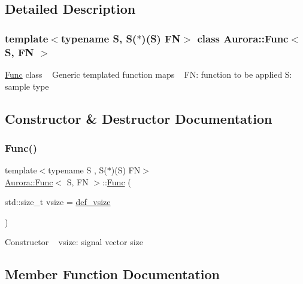 \subsection{Detailed Description}
\subsubsection*{template$<$typename S, S($\ast$)(\+S) FN$>$\newline
class Aurora\+::\+Func$<$ S, F\+N $>$}

\hyperlink{class_aurora_1_1_func}{Func} class ~\newline
Generic templated function maps ~\newline
FN\+: function to be applied S\+: sample type 

\subsection{Constructor \& Destructor Documentation}
\mbox{\label{class_aurora_1_1_func_a2a97c0f4eaf70c7e922876debeb14abe}} 
\subsubsection{\texorpdfstring{Func()}{Func()}}
{\footnotesize\ttfamily template$<$typename S , S($\ast$)(\+S) FN$>$ \\
\hyperlink{class_aurora_1_1_func}{Aurora\+::\+Func}$<$ S, FN $>$\+::\hyperlink{class_aurora_1_1_func}{Func} (\begin{DoxyParamCaption}\item[{std\+::size\+\_\+t}]{vsize = {\ttfamily \hyperlink{namespace_aurora_afaaddf667a06e7ce23c667a8b7295263}{def\+\_\+vsize}} }\end{DoxyParamCaption})\hspace{0.3cm}{\ttfamily [inline]}}

Constructor ~\newline
vsize\+: signal vector size 

\subsection{Member Function Documentation}
\mbox{\label{class_aurora_1_1_func_aa7664032aef8be96cdfd33b968a1f226}} 
